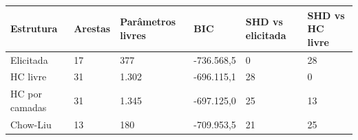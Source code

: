 \begin{tabular}{llllll}
\toprule
Estrutura & Arestas & Parâmetros livres & BIC & SHD vs elicitada & SHD vs HC livre \\
\midrule
Elicitada & 17 & 377 & -736.568,5 & 0 & 28 \\
HC livre & 31 & 1.302 & -696.115,1 & 28 & 0 \\
HC por camadas & 31 & 1.345 & -697.125,0 & 25 & 13 \\
Chow-Liu & 13 & 180 & -709.953,5 & 21 & 25 \\
\bottomrule
\end{tabular}
